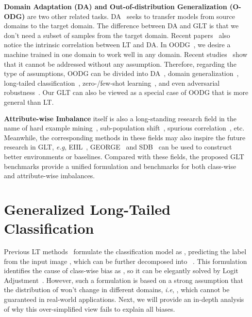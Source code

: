 \documentclass{article}
\def\eg{\emph{e.g}} \def\Eg{\emph{E.g}}
\def\ie{\emph{i.e}} \def\Ie{\emph{I.e}}
\begin{document}
\noindent\textbf{Domain Adaptation (DA) and Out-of-distribution Generalization (O-ODG)} are two other related tasks. DA~\cite{wilson2020survey,wang2018deep,zhao2019learning,yue2021transporting} seeks to transfer models from source domains to the target domain. The difference between DA and GLT is that we don't need a subset of samples from the target domain. Recent papers~\cite{jamal2020rethinking,zou2018unsupervised} also notice the intrinsic correlation between LT and DA. In OODG~\cite{zhao21robin,arjovsky2020out,krueger2021out,arjovsky2019invariant}, we desire a machine trained in one domain to work well in any domain. Recent studies~\cite{arjovsky2020out} show that it cannot be addressed without any assumption. Therefore, regarding the type of assumptions, OODG can be divided into DA~\cite{wang2018deep}, domain generalization~\cite{li2017deeper}, long-tailed classification~\cite{zhang2021deep}, zero-/few-shot learning~\cite{sung2018learning,wang2019few,wang2019survey}, and even adversarial robustness~\cite{carlini2019evaluating,chakraborty2018adversarial}. Our GLT can also be viewed as a special case of OODG that is more general than LT.


\noindent\textbf{Attribute-wise Imbalance} itself is also a long-standing research field in the name of hard example mining~\cite{lin2017focal,nam2020learning}, sub-population shift~\cite{santurkar2020breeds,liang2022metashift,koh2021wilds}, spurious correlation~\cite{srivastava2020robustness,agarwal2020towards}, etc.  Meanwhile, the corresponding methods in these fields may also inspire the future research in GLT, \eg, EIIL~\cite{creager2021environment}, GEORGE~\cite{sohoni2020no} and SDB~\cite{idrissi2022simple} can be used to construct better environments or baselines. Compared with these fields, the proposed GLT benchmarks provide a unified formulation and benchmarks for both class-wise and attribute-wise imbalances.



%
 
\section{Generalized Long-Tailed Classification}
\label{sec:3}

Previous LT methods~\cite{ren2020balanced,menon2020long} formulate the classification model as , predicting the label  from the input image , which can be further decomposed into ~\cite{menon2020long,ren2020balanced}. This formulation identifies the cause of class-wise bias as , so it can be elegantly solved by Logit Adjustment~\cite{menon2020long}. However, such a formulation is based on a strong assumption that the distribution of  won't change in different domains, \ie, , which cannot be guaranteed in real-world applications. Next, we will provide an in-depth analysis of why this over-simplified view fails to explain all biases.
\end{document}

